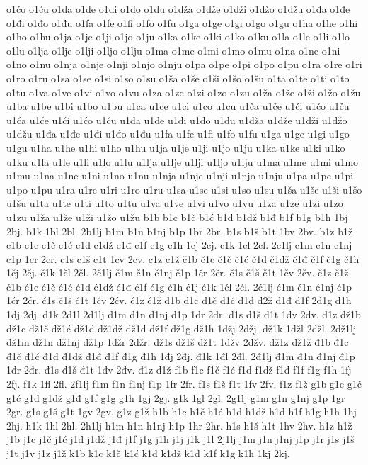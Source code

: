{o1ćo
o1ću
o1da
o1de
o1di
o1do
o1du
o1dža
o1dže
o1dži
o1džo
o1džu
o1đa
o1đe
o1đi
o1đo
o1đu
o1fa
o1fe
o1fi
o1fo
o1fu
o1ga
o1ge
o1gi
o1go
o1gu
o1ha
o1he
o1hi
o1ho
o1hu
o1ja
o1je
o1ji
o1jo
o1ju
o1ka
o1ke
o1ki
o1ko
o1ku
o1la
o1le
o1li
o1lo
o1lu
o1lja
o1lje
o1lji
o1ljo
o1lju
o1ma
o1me
o1mi
o1mo
o1mu
o1na
o1ne
o1ni
o1no
o1nu
o1nja
o1nje
o1nji
o1njo
o1nju
o1pa
o1pe
o1pi
o1po
o1pu
o1ra
o1re
o1ri
o1ro
o1ru
o1sa
o1se
o1si
o1so
o1su
o1ša
o1še
o1ši
o1šo
o1šu
o1ta
o1te
o1ti
o1to
o1tu
o1va
o1ve
o1vi
o1vo
o1vu
o1za
o1ze
o1zi
o1zo
o1zu
o1ža
o1že
o1ži
o1žo
o1žu
u1ba
u1be
u1bi
u1bo
u1bu
u1ca
u1ce
u1ci
u1co
u1cu
u1ča
u1če
u1či
u1čo
u1ču
u1ća
u1će
u1ći
u1ćo
u1ću
u1da
u1de
u1di
u1do
u1du
u1dža
u1dže
u1dži
u1džo
u1džu
u1đa
u1đe
u1đi
u1đo
u1đu
u1fa
u1fe
u1fi
u1fo
u1fu
u1ga
u1ge
u1gi
u1go
u1gu
u1ha
u1he
u1hi
u1ho
u1hu
u1ja
u1je
u1ji
u1jo
u1ju
u1ka
u1ke
u1ki
u1ko
u1ku
u1la
u1le
u1li
u1lo
u1lu
u1lja
u1lje
u1lji
u1ljo
u1lju
u1ma
u1me
u1mi
u1mo
u1mu
u1na
u1ne
u1ni
u1no
u1nu
u1nja
u1nje
u1nji
u1njo
u1nju
u1pa
u1pe
u1pi
u1po
u1pu
u1ra
u1re
u1ri
u1ro
u1ru
u1sa
u1se
u1si
u1so
u1su
u1ša
u1še
u1ši
u1šo
u1šu
u1ta
u1te
u1ti
u1to
u1tu
u1va
u1ve
u1vi
u1vo
u1vu
u1za
u1ze
u1zi
u1zo
u1zu
u1ža
u1že
u1ži
u1žo
u1žu
b1b
b1c
b1č
b1ć
b1d
b1dž
b1đ
b1f
b1g
b1h
1bj
2bj.
b1k
1bl
2bl.
2b1lj
b1m
b1n
b1nj
b1p
1br
2br.
b1s
b1š
b1t
1bv
2bv.
b1z
b1ž
c1b
c1c
c1č
c1ć
c1d
c1dž
c1đ
c1f
c1g
c1h
1cj
2cj.
c1k
1cl
2cl.
2c1lj
c1m
c1n
c1nj
c1p
1cr
2cr.
c1s
c1š
c1t
1cv
2cv.
c1z
c1ž
č1b
č1c
č1č
č1ć
č1d
č1dž
č1đ
č1f
č1g
č1h
1čj
2čj.
č1k
1čl
2čl.
2č1lj
č1m
č1n
č1nj
č1p
1čr
2čr.
č1s
č1š
č1t
1čv
2čv.
č1z
č1ž
ć1b
ć1c
ć1č
ć1ć
ć1d
ć1dž
ć1đ
ć1f
ć1g
ć1h
ć1j
ć1k
1ćl
2ćl.
2ć1lj
ć1m
ć1n
ć1nj
ć1p
1ćr
2ćr.
ć1s
ć1š
ć1t
1ćv
2ćv.
ć1z
ć1ž
d1b
d1c
d1č
d1ć
d1d
d2ž
d1đ
d1f
2d1g
d1h
1dj
2dj.
d1k
2d1l
2d1lj
d1m
d1n
d1nj
d1p
1dr
2dr.
d1s
d1š
d1t
1dv
2dv.
d1z
dž1b
dž1c
dž1č
dž1ć
dž1d
dž1dž
dž1đ
dž1f
dž1g
dž1h
1džj
2džj.
dž1k
1džl
2džl.
2dž1lj
dž1m
dž1n
dž1nj
dž1p
1džr
2džr.
dž1s
dž1š
dž1t
1džv
2džv.
dž1z
dž1ž
đ1b
đ1c
đ1č
đ1ć
đ1d
đ1dž
đ1đ
đ1f
đ1g
đ1h
1đj
2đj.
đ1k
1đl
2đl.
2đ1lj
đ1m
đ1n
đ1nj
đ1p
1đr
2đr.
đ1s
đ1š
đ1t
1đv
2đv.
đ1z
đ1ž
f1b
f1c
f1č
f1ć
f1d
f1dž
f1đ
f1f
f1g
f1h
1fj
2fj.
f1k
1fl
2fl.
2f1lj
f1m
f1n
f1nj
f1p
1fr
2fr.
f1s
f1š
f1t
1fv
2fv.
f1z
f1ž
g1b
g1c
g1č
g1ć
g1d
g1dž
g1đ
g1f
g1g
g1h
1gj
2gj.
g1k
1gl
2gl.
2g1lj
g1m
g1n
g1nj
g1p
1gr
2gr.
g1s
g1š
g1t
1gv
2gv.
g1z
g1ž
h1b
h1c
h1č
h1ć
h1d
h1dž
h1đ
h1f
h1g
h1h
1hj
2hj.
h1k
1hl
2hl.
2h1lj
h1m
h1n
h1nj
h1p
1hr
2hr.
h1s
h1š
h1t
1hv
2hv.
h1z
h1ž
j1b
j1c
j1č
j1ć
j1d
j1dž
j1đ
j1f
j1g
j1h
j1j
j1k
j1l
2j1lj
j1m
j1n
j1nj
j1p
j1r
j1s
j1š
j1t
j1v
j1z
j1ž
k1b
k1c
k1č
k1ć
k1d
k1dž
k1đ
k1f
k1g
k1h
1kj
2kj.
}
